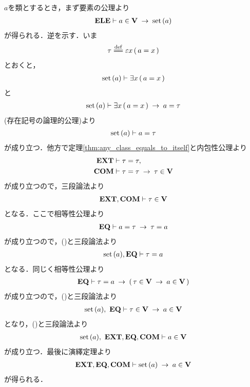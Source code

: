 	\begin{prf}
		$a$を類とするとき，まず要素の公理より
		\begin{align}
			\mbox{{\bf ELE}} \vdash a \in \mathbf{V} \hspace{0.25em}\rightarrow\hspace{0.25em} \operatorname*{set}\hspace{0.15em}(a)
		\end{align}
		が得られる．逆を示す．いま
		\begin{align}
			\tau \defeq \varepsilon x\, (\, a = x\, )
		\end{align}
		とおくと，
		\begin{align}
			\operatorname*{set}\hspace{0.15em}(a) \vdash \exists x\, (\, a = x\, )
		\end{align}
		と
		\begin{align}
			\operatorname*{set}\hspace{0.15em}(a) \vdash \exists x\, (\, a = x\, ) \hspace{0.25em}\rightarrow\hspace{0.25em} a = \tau
		\end{align}
		(存在記号の論理的公理)より
		\begin{align}
			\operatorname*{set}\hspace{0.15em}(a) \vdash a = \tau
			\label{fom:thm_V_is_the_whole_of_sets_1}
		\end{align}
		が成り立つ．他方で定理\ref{thm:any_class_equals_to_itself}と内包性公理より
		\begin{align}
			\mbox{{\bf EXT}} &\vdash \tau = \tau, \\
			\mbox{\bf COM} &\vdash \tau = \tau \hspace{0.25em}\rightarrow\hspace{0.25em} \tau \in \mathbf{V}
		\end{align}
		が成り立つので，三段論法より
		\begin{align}
			\mbox{{\bf EXT}},\mbox{\bf COM} \vdash \tau \in \mathbf{V}
			\label{fom:thm_V_is_the_whole_of_sets_2}
		\end{align}
		となる．ここで相等性公理より
		\begin{align}
			\mbox{{\bf EQ}} \vdash a = \tau \hspace{0.25em}\rightarrow\hspace{0.25em} \tau = a
		\end{align}
		が成り立つので，()と三段論法より
		\begin{align}
			\operatorname*{set}\hspace{0.15em}(a),\mbox{{\bf EQ}} \vdash \tau = a
			\label{fom:thm_V_is_the_whole_of_sets_3}
		\end{align}
		となる．同じく相等性公理より
		\begin{align}
			\mbox{{\bf EQ}} \vdash \tau = a \hspace{0.25em}\rightarrow\hspace{0.25em} (\, \tau \in \mathbf{V} \hspace{0.25em}\rightarrow\hspace{0.25em} a \in \mathbf{V}\, )
		\end{align}
		が成り立つので，()と三段論法より
		\begin{align}
			\operatorname*{set}\hspace{0.15em}(a),\ \mbox{{\bf EQ}} \vdash \tau \in \mathbf{V} \hspace{0.25em}\rightarrow\hspace{0.25em} a \in \mathbf{V}
		\end{align}
		となり，()と三段論法より
		\begin{align}
			\operatorname*{set}\hspace{0.15em}(a),\ \mbox{{\bf EXT}},\mbox{{\bf EQ}},\mbox{\bf COM} \vdash a \in \mathbf{V}
		\end{align}
		が成り立つ．最後に演繹定理より
		\begin{align}
			\mbox{{\bf EXT}},\mbox{{\bf EQ}},\mbox{\bf COM} \vdash \operatorname*{set}\hspace{0.15em}(a) \hspace{0.25em}\rightarrow\hspace{0.25em} a \in \mathbf{V}
		\end{align}
		が得られる．
		\QED
	\end{prf}
	
